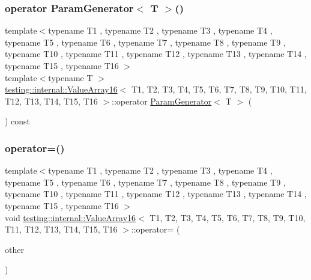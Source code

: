 \subsubsection{\texorpdfstring{operator ParamGenerator$<$ T $>$()}{operator ParamGenerator< T >()}}
{\footnotesize\ttfamily template$<$typename T1 , typename T2 , typename T3 , typename T4 , typename T5 , typename T6 , typename T7 , typename T8 , typename T9 , typename T10 , typename T11 , typename T12 , typename T13 , typename T14 , typename T15 , typename T16 $>$ \\
template$<$typename T $>$ \\
\mbox{\hyperlink{classtesting_1_1internal_1_1_value_array16}{testing\+::internal\+::\+Value\+Array16}}$<$ T1, T2, T3, T4, T5, T6, T7, T8, T9, T10, T11, T12, T13, T14, T15, T16 $>$\+::operator \mbox{\hyperlink{classtesting_1_1internal_1_1_param_generator}{Param\+Generator}}$<$ T $>$ (\begin{DoxyParamCaption}{ }\end{DoxyParamCaption}) const\hspace{0.3cm}{\ttfamily [inline]}}

\mbox{\label{classtesting_1_1internal_1_1_value_array16_af4e10f252d7b51b140bbebc4b22d6cf9}} 
\subsubsection{\texorpdfstring{operator=()}{operator=()}}
{\footnotesize\ttfamily template$<$typename T1 , typename T2 , typename T3 , typename T4 , typename T5 , typename T6 , typename T7 , typename T8 , typename T9 , typename T10 , typename T11 , typename T12 , typename T13 , typename T14 , typename T15 , typename T16 $>$ \\
void \mbox{\hyperlink{classtesting_1_1internal_1_1_value_array16}{testing\+::internal\+::\+Value\+Array16}}$<$ T1, T2, T3, T4, T5, T6, T7, T8, T9, T10, T11, T12, T13, T14, T15, T16 $>$\+::operator= (\begin{DoxyParamCaption}\item[{const \mbox{\hyperlink{classtesting_1_1internal_1_1_value_array16}{Value\+Array16}}$<$ T1, T2, T3, T4, T5, T6, T7, T8, T9, T10, T11, T12, T13, T14, T15, T16 $>$ \&}]{other }\end{DoxyParamCaption})\hspace{0.3cm}{\ttfamily [private]}}




